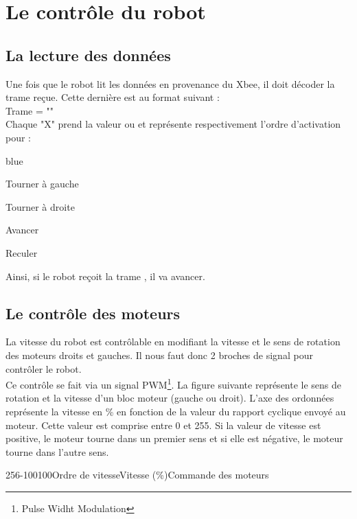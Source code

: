 \section{Le contrôle du robot}


\subsection{La lecture des données}
Une fois que le robot lit les données en provenance du Xbee, il doit décoder la trame reçue. Cette dernière est au format suivant : \\

Trame = ""\\

Chaque "X" prend la valeur  ou  et représente respectivement l'ordre d'activation pour :

\begin{items}{blue}{\Bullet}
    \item Tourner à gauche
    \item Tourner à droite
    \item Avancer
    \item Reculer
\end{items}


Ainsi, si le robot reçoit la trame , il va avancer.

\subsection{Le contrôle des moteurs}

La vitesse du robot est contrôlable en modifiant la vitesse et le sens de rotation des moteurs droits et gauches. Il nous faut donc 2 broches de signal pour contrôler le robot.\\

Ce contrôle se fait via un signal PWM\footnote{Pulse Widht Modulation}. 
La figure suivante représente le sens de rotation et la vitesse d'un bloc moteur (gauche ou droit). L'axe des ordonnées représente la vitesse en \% en fonction de la valeur du rapport cyclique envoyé au moteur. Cette valeur est comprise entre 0 et 255.
Si la valeur de vitesse est positive, le moteur tourne dans un premier sens et si elle est négative, le moteur tourne dans l'autre sens.

\label{moteur}
\begin{graphicFigure}{0.6}{0.6}{-1}{256}{-100}{100}{Ordre de vitesse}{Vitesse (\%)}{Commande des moteurs}
\end{graphicFigure}

